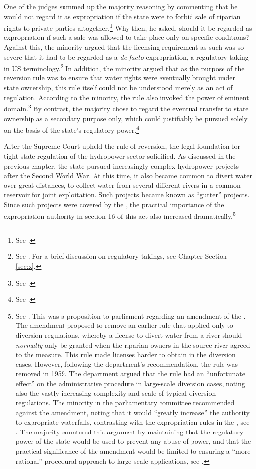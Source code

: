 One of the judges summed up the majority reasoning by commenting that he would not regard it as expropriation if the state were to forbid sale of riparian rights to private parties altogether.\footnote{See \cite[407]{johansen18}.} Why then, he asked, should it be regarded as expropriation if such a sale was allowed to take place only on specific conditions? Against this, the minority argued that the licensing requirement as such was so severe that it had to be regarded as a {\it de facto} expropriation, a regulatory taking in US terminology.\footnote{See \cite[412-413]{johansen18}. For a brief discussion on regulatory takings, see Chapter \cite{chap:1} Section \ref{sec:x}.} In addition, the minority argued that  as the purpose of the reversion rule was to ensure that water rights were eventually brought under state ownership, this rule itself could not be understood merely as an act of regulation. According to the minority, the rule also invoked the power of eminent domain.\footnote{See \cite[415-416]{johansen18}.} By contrast, the majority chose to regard the eventual transfer to state ownership as a secondary purpose only, which could justifiably be pursued solely on the basis of the state's regulatory power.\footnote{See \cite[407]{johansen18}.}

After the Supreme Court upheld the rule of reversion, the legal foundation for tight state regulation of the hydropower sector solidified. 
As discussed in the previous chapter, the state pursued increasingly complex hydropower projects after the Second World War. At this time, it also became common to divert water over great distances, to collect water from several different rivers in a common reservoir for joint exploitation. Such projects became known as ``gutter'' projects. Since such projects were covered by the \cite{wra17}, the practical importance of the expropriation authority in section 16 of this act also increased dramatically.\footnote{See \cite[11]{insst59}. This was a proposition to parliament regarding an amendment of the \cite{wra17}. The amendment proposed to remove an earlier rule that applied only to diversion regulations, whereby a license to divert water from a river should {\it normally} only be granted when the riparian owners in the source river agreed to the measure. This rule made licenses harder to obtain in the diversion cases. However, following the department's recommendation, the rule was removed in 1959. The department argued that the rule had an ``unfortunate effect'' on the administrative procedure in large-scale diversion cases, noting also the vastly increasing complexity and scale of typical diversion regulations. The minority in the parliamentary committee recommended against the amendment, noting that it would ``greatly increase'' the authority to expropriate waterfalls, contrasting with the expropriation rules in the \cite{wra40}, see \cite[14]{innst59}. The majority countered this argument by maintaining that the regulatory power of the state would be used to prevent any abuse of power, and that the practical significance of the amendment would be limited to ensuring a ``more rational'' procedural approach to large-scale applications, see \cite[14]{innst59}.}

